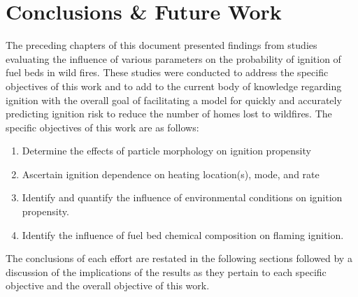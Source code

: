 
\chapter{Conclusions \& Future Work}
\label{part:conclusion}
\label{part:results}
The preceding chapters of this document presented findings from studies evaluating the influence of various parameters on the probability of ignition of fuel beds in wild fires. These studies were conducted to address the specific objectives of this work and to add to the current body of knowledge regarding ignition with the overall goal of facilitating a model for quickly and accurately predicting ignition risk to reduce the number of homes lost to wildfires. The specific objectives of this work are as follows:
        \begin{enumerate}
            \item Determine the effects of particle morphology on ignition propensity
            \item Ascertain ignition dependence on heating location(s), mode, and rate
            \item Identify and quantify the influence of environmental conditions on ignition propensity.
            \item Identify the influence of fuel bed chemical composition on flaming ignition.
        \end{enumerate}
The conclusions of each effort are restated in the following sections followed by a discussion of the implications of the results as they pertain to each specific objective and the overall objective of this work.

